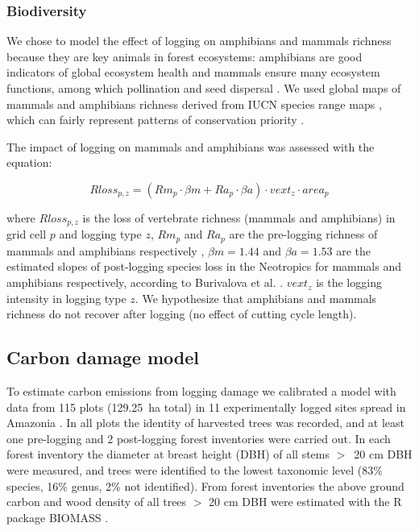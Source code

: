 \documentclass{article}
\begin{document}
\subsubsection{Biodiversity}

We chose to model the effect of logging on amphibians and mammals richness because they are key animals in forest ecosystems: amphibians are good indicators of global ecosystem health \cite{Welsh1998,Collins2003} and mammals ensure many ecosystem functions, among which pollination \cite{Fleming2009} and seed dispersal \cite{Wright2000,Muscarella2007}. We used global maps of mammals and amphibians richness derived from IUCN species range maps \cite{Jenkins2013,MapBiodiv}, which can fairly represent patterns of conservation priority \cite{Marechaux2017}.

The impact of logging on mammals and amphibians was assessed with the equation: 

\begin{equation}
\label{eq:rloss}
Rloss_{p,z} = \left(Rm_{p} \cdot \beta m + Ra_{p} \cdot \beta a  \right)  \cdot vext_z \cdot area_p 
\end{equation}

where $Rloss_{p,z}$ is the loss of vertebrate richness (mammals and amphibians) in grid cell $p$ and logging type $z$, $Rm_{p}$ and $Ra_p$ are the pre-logging richness of mammals and amphibians respectively \cite{Jenkins2013}, $\beta m = 1.44$ and $\beta a = 1.53$  are the estimated slopes of post-logging species loss in the Neotropics for mammals and amphibians respectively, according to Burivalova et al.  \cite{Burivalova2014}. $vext_z$ is the logging intensity in logging type $z$.
We hypothesize that amphibians and mammals richness do not recover after logging (no effect of cutting cycle length). 

\subsection{Carbon damage model}
\label{supmat:cdam}

To estimate carbon emissions from logging damage we calibrated a model with data from 115 plots (129.25~ha total) in 11 experimentally logged sites spread in Amazonia \cite{Sist2015}. In all plots the identity of harvested trees was recorded, and at least one pre-logging and 2 post-logging forest inventories were carried out. In each forest inventory the diameter at breast height (DBH) of all stems $>$~20 cm DBH were measured, and trees were identified to the lowest taxonomic level (83\% species, 16\% genus, 2\% not identified). 
From forest inventories the above ground carbon and wood density of all trees $>$ 20 cm DBH  were estimated with the R package BIOMASS \cite{Rejou-Mechain2017}. 
\end{document}
